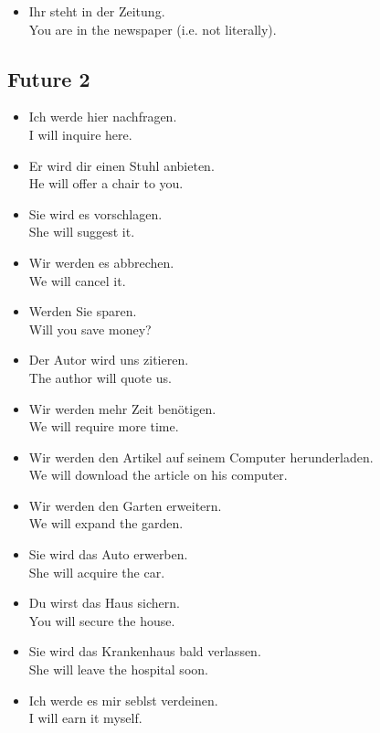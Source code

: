 \begin{itemize}
  \item  Ihr steht in der Zeitung. \\ You are in the newspaper (i.e. not literally).
\end{itemize}


\pagebreak
\subsection{Future 2}

\begin{itemize}
  \item  Ich werde hier nachfragen. \\ I will inquire here.
  \item  Er wird dir einen Stuhl anbieten. \\ He will offer a chair to you.
  \item  Sie wird es vorschlagen. \\ She will suggest it.
  \item  Wir werden es abbrechen. \\ We will cancel it.
  \item  Werden Sie sparen. \\ Will you save money?
  \item  Der Autor wird uns zitieren. \\ The author will quote us.
  \item  Wir werden mehr Zeit ben{\"o}tigen. \\ We will require more time.
  \item  Wir werden den Artikel auf seinem Computer herunderladen. \\ We will download the article on his computer.
  \item  Wir werden den Garten erweitern. \\ We will expand the garden.
  \item  Sie wird das Auto erwerben. \\ She will acquire the car.
  \item  Du wirst das Haus sichern. \\ You will secure the house.
  \item  Sie wird das Krankenhaus bald verlassen. \\ She will leave the hospital soon.
  \item  Ich werde es mir seblst verdeinen. \\ I will earn it myself.
\end{itemize}


